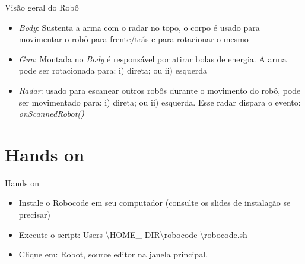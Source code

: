 \begin{frame}
	\begin{block}{Visão geral do Robô}
		\begin{itemize}
			\item \emph{Body}: Sustenta a arma com o radar no topo, o corpo é usado para movimentar o robô para frente/trás e para rotacionar o mesmo
			
			\item \emph{Gun}: Montada no \emph{Body} é responsável por atirar bolas de energia. A arma pode ser rotacionada para: i) direta; ou ii) esquerda

			\item \emph{Radar}: usado para escanear outros robôs durante o movimento do robô, pode ser movimentado para: i) direta; ou ii) esquerda. Esse radar dispara o evento:  \emph{onScannedRobot()}  \citep{ROBOWIKI}
						
		\end{itemize}
	\end{block}
\end{frame}


\section{Hands on}

\begin{frame}
	\begin{block}{Hands on}
		\begin{itemize}
			\item Instale o Robocode em seu computador (consulte os slides de instalação se precisar)
			
			\item Execute o script:  Users \textbackslash HOME\_ DIR\textbackslash robocode \textbackslash robocode.sh
			
			\item Clique em: Robot, source editor na janela principal.
		\end{itemize}
	\end{block}
\end{frame}


